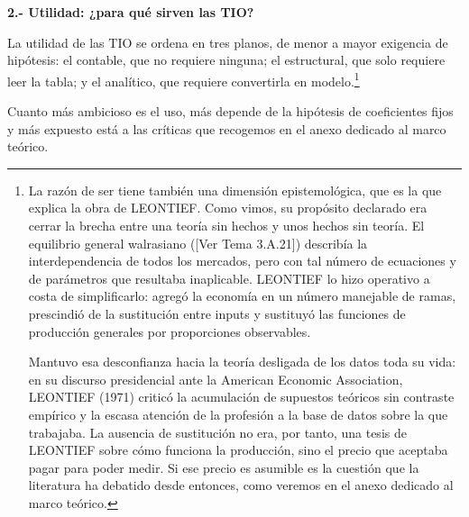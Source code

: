 \documentclass[10pt,a4paper]{article}
\newcommand{\authorfont}[1]{{\fontfamily{EBGaramond-TLF}\selectfont #1}}
\newcounter{anexo}
\begin{document}
\textbf{2.- Utilidad: ¿para qué sirven las TIO?}

La utilidad de las TIO se ordena en tres planos, de menor a mayor exigencia de hipótesis: el contable, que no requiere ninguna; el estructural, que solo requiere leer la tabla; y el analítico, que requiere convertirla en modelo.\footnote{%
  La razón de ser tiene también una dimensión epistemológica, que es la que explica la obra de LEONTIEF. Como vimos, su propósito declarado era cerrar la brecha entre una teoría sin hechos y unos hechos sin teoría. El equilibrio general walrasiano ([\authorfont{Ver Tema 3.A.21}]) describía la interdependencia de todos los mercados, pero con tal número de ecuaciones y de parámetros que resultaba inaplicable. LEONTIEF lo hizo operativo a costa de simplificarlo: agregó la economía en un número manejable de ramas, prescindió de la sustitución entre inputs y sustituyó las funciones de producción generales por proporciones observables.
  
  Mantuvo esa desconfianza hacia la teoría desligada de los datos toda su vida: en su discurso presidencial ante la American Economic Association, LEONTIEF (1971) criticó la acumulación de supuestos teóricos sin contraste empírico y la escasa atención de la profesión a la base de datos sobre la que trabajaba. La ausencia de sustitución no era, por tanto, una tesis de LEONTIEF sobre cómo funciona la producción, sino el precio que aceptaba pagar para poder medir. Si ese precio es asumible es la cuestión que la literatura ha debatido desde entonces, como veremos en el anexo dedicado al marco teórico.
}

Cuanto más ambicioso es el uso, más depende de la hipótesis de coeficientes fijos y más expuesto está a las críticas que recogemos en el anexo dedicado al marco teórico.
\end{document}
